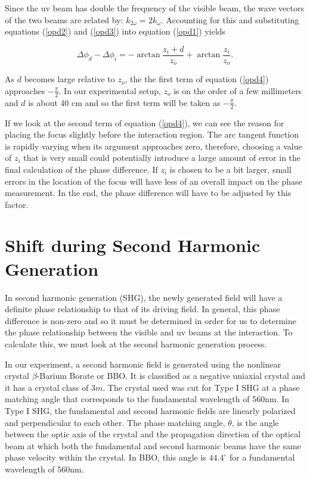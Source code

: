 Since the uv beam has double the frequency of the visible beam,
the wave vectors of the two beams are related by:
$k_{2\omega}=2k_\omega$.  Accounting for this and substituting
equations (\ref{opd2}) and (\ref{opd3}) into equation (\ref{opd1})
yields

\begin{equation}\label{opd4}
\Delta\phi_{d}-\Delta\phi_{i}=-\arctan{\frac{z_i+d}{z_o}}+\arctan{\frac{z_i}{z_o}}.
\end{equation}

As $d$ becomes large relative to $z_o$, the the first term of
equation (\ref{opd4}) approaches $-\frac{\pi}{2}$.  In our
experimental setup, $z_o$ is on the order of a few millimeters and
$d$ is about 40 cm and so the first term will be taken as
$-\frac{\pi}{2}$.

If we look at the second term of equation (\ref{opd4}), we can see
the reason for placing the focus slightly before the interaction
region.  The arc tangent function is rapidly varying when its
argument approaches zero, therefore, choosing a value of $z_i$
that is very small could potentially introduce a large amount of
error in the final calculation of the phase difference.  If $z_i$
is chosen to be a bit larger, small errors in the location of the
focus will have less of an overall impact on the phase
measurement.  In the end, the phase difference will have to be
adjusted by this factor.


\section{Shift during Second Harmonic Generation}

In second harmonic generation (SHG), the newly generated field
will have a definite phase relationship to that of its driving
field. In general, this phase difference is non-zero and so it
must be determined in order for us to determine the phase
relationship between the visible and uv beams at the interaction.
To calculate this, we must look at the second harmonic generation
process.

In our experiment, a second harmonic field is generated using the
nonlinear crystal $\beta$-Barium Borate or BBO.  It is classified
as a negative uniaxial crystal and it has a crystal class of 3$m$.
The crystal used was cut for Type I SHG at a phase matching angle
that corresponds to the fundamental wavelength of 560nm. In Type I
SHG, the fundamental and second harmonic fields are linearly
polarized and perpendicular to each other.  The phase matching
angle, $\theta$, is the angle between the optic axis of the
crystal and the propagation direction of the optical beam at which
both the fundamental and second harmonic beams have the same phase
velocity within the crystal.  In BBO, this angle is $44.4^\circ$
for a fundamental wavelength of 560nm.

